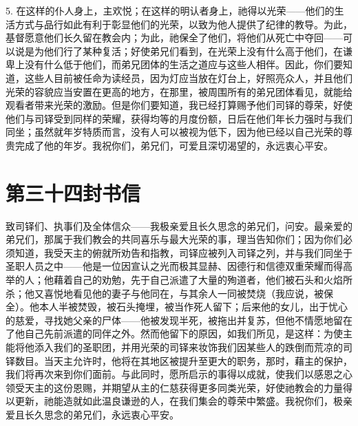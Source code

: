 5. 在这样的仆人身上，主欢悦；在这样的明认者身上，祂得以光荣——他们的生活方式与品行如此有利于彰显他们的光荣，以致为他人提供了纪律的教导。为此，基督愿意他们长久留在教会内；为此，祂保全了他们，将他们从死亡中夺回——可以说是为他们行了某种复活；好使弟兄们看到，在光荣上没有什么高于他们，在谦卑上没有什么低于他们，而弟兄团体的生活之道应与这些人相伴。因此，你们要知道，这些人目前被任命为读经员，因为灯应当放在灯台上，好照亮众人，并且他们光荣的容貌应当安置在更高的地方，在那里，被周围所有的弟兄团体看见，就能给观看者带来光荣的激励。但是你们要知道，我已经打算赐予他们司铎的尊荣，好使他们与司铎受到同样的荣耀，获得均等的月度份额，日后在他们年长力强时与我们同坐；虽然就年岁特质而言，没有人可以被视为低下，因为他已经以自己光荣的尊贵完成了他的年岁。我祝你们，弟兄们，可爱且深切渴望的，永远衷心平安。\par



\section{第三十四封书信}

\par

\par

致司铎们、执事们及全体信众——我极亲爱且长久思念的弟兄们，问安。最亲爱的弟兄们，那属于我们教会的共同喜乐与最大光荣的事，理当告知你们；因为你们必须知道，我受天主的俯就所劝告和指教，司铎应被列入司铎之列，并与我们同坐于圣职人员之中——他是一位因宣认之光而极其显赫、因德行和信德双重荣耀而得高举的人；他藉着自己的劝勉，先于自己派遣了大量的殉道者，他们被石头和火焰所杀；他又喜悦地看见他的妻子与他同在，与其余人一同被焚烧（我应说，被保全）。他本人半被焚毁，被石头掩埋，被当作死人留下；后来他的女儿，出于忧心的慈爱，寻找她父亲的尸体——他被发现半死，被拖出并复苏，但他不情愿地留在了他自己先前派遣的同伴之外。然而他留下的原因，如我们所见，是这样：为使主能将他添入我们的圣职团，并用光荣的司铎来妆饰我们因某些人的跌倒而荒凉的司铎数目。当天主允许时，他将在其地区被提升至更大的职务，那时，藉主的保护，我们将再次来到你们面前。与此同时，愿所启示的事得以成就，使我们以感恩之心领受天主的这份恩赐，并期望从主的仁慈获得更多同类光荣，好使祂教会的力量得以更新，祂能造就如此温良谦逊的人，在我们集会的尊荣中繁盛。我祝你们，极亲爱且长久思念的弟兄们，永远衷心平安。\par


